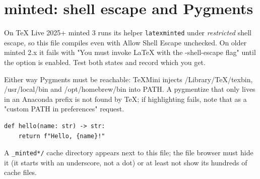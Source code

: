 \documentclass{article}
\begin{document}
\section{minted: shell escape and Pygments}
On TeX Live 2025+ minted 3 runs its helper \texttt{latexminted} under
\emph{restricted} shell escape, so this file compiles even with Allow Shell
Escape unchecked. On older minted 2.x it fails with "You must invoke LaTeX with
the -shell-escape flag" until the option is enabled. Test both states and
record which you get.

Either way Pygments must be reachable: TeXMini injects /Library/TeX/texbin,
/usr/local/bin and /opt/homebrew/bin into PATH. A pygmentize that only lives in
an Anaconda prefix is not found by TeX; if highlighting fails, note that as a
"custom PATH in preferences" request.

\begin{verbatim}
def hello(name: str) -> str:
    return f"Hello, {name}!"
\end{verbatim}

A \texttt{\_minted*/} cache directory appears next to this file; the file
browser must hide it (it starts with an underscore, not a dot) or at least not
show its hundreds of cache files.
\end{document}
